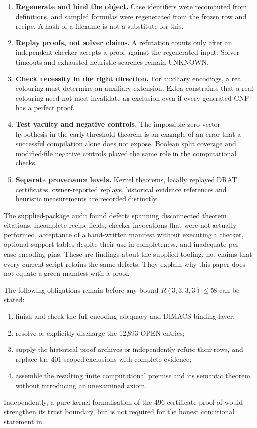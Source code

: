 \documentclass[11pt]{article}
\newcommand{\R}{R(3,3,3,3)}
\theoremstyle{definition}
\theoremstyle{remark}
\begin{document}
\begin{enumerate}[label=\textup{(\alph*)},leftmargin=2em]
 \item \textbf{Regenerate and bind the object.} Case identifiers were
 recomputed from definitions, and sampled formulas were regenerated from the
 frozen row and recipe.  A hash of a filename is not a substitute for this.
 \item \textbf{Replay proofs, not solver claims.} A refutation counts only
 after an independent checker accepts a proof against the regenerated input.
 Solver timeouts and exhausted heuristic searches remain UNKNOWN.
 \item \textbf{Check necessity in the right direction.} For auxiliary
 encodings, a real colouring must determine an auxiliary extension.  Extra
 constraints that a real colouring need not meet invalidate an exclusion even
 if every generated CNF has a perfect proof.
 \item \textbf{Test vacuity and negative controls.} The impossible zero-vector
 hypothesis in the early threshold theorem is an example of an error that a
 successful compilation alone does not expose.  Boolean split coverage and
 modified-file negative controls played the same role in the computational
 checks.
 \item \textbf{Separate provenance levels.} Kernel theorems, locally replayed
 DRAT certificates, owner-reported replays, historical evidence references
 and heuristic measurements are recorded distinctly.
\end{enumerate}

The supplied-package audit found defects spanning disconnected theorem
citations, incomplete recipe fields, checker invocations that were not actually
performed, acceptance of a hand-written manifest without executing a checker,
optional support tables despite their use in completeness, and inadequate
per-case encoding pins.  These are findings about the supplied tooling, not
claims that every current script retains the same defects.  They explain why
this paper does not equate a green manifest with a proof.

The following obligations remain before any bound $\R\leq58$ can be stated:
\begin{enumerate}[label=\textup{(\arabic*)},nosep]
 \item finish and check the full encoding-adequacy and DIMACS-binding layer;
 \item resolve or explicitly discharge the 12,893 OPEN entries;
 \item supply the historical proof archives or independently refute their
 rows, and replace the 401 scoped exclusions with complete evidence;
 \item assemble the resulting finite computational premise and its semantic
 theorem without introducing an unexamined axiom.
\end{enumerate}
Independently, a pure-kernel formalisation of the 496-certificate proof of
 would strengthen its trust boundary, but is not required for
the honest conditional statement in .
\end{document}
